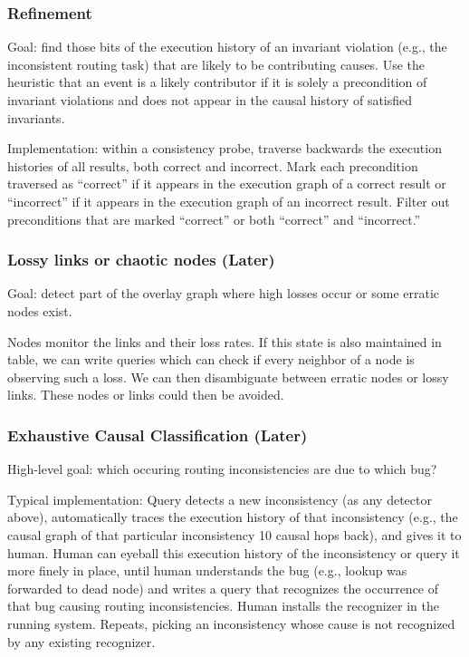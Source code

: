 \documentclass{sig-alt-full}
\begin{document}
{\subsubsection{Refinement}
Goal: find those bits of the execution history of an invariant violation
(e.g., the inconsistent routing task) that are likely to be contributing
causes.  Use the heuristic that an event is a likely contributor if it
is solely a precondition of invariant violations and does not appear in
the causal history of satisfied invariants.

Implementation: within a consistency probe, traverse backwards the
execution histories of all results, both correct and incorrect.  Mark
each precondition traversed as ``correct'' if it appears in the
execution graph of a correct result or ``incorrect'' if it appears in
the execution graph of an incorrect result.  Filter out preconditions
that are marked ``correct'' or both ``correct'' and ``incorrect.''




\subsubsection{Lossy links or chaotic nodes (Later)}

Goal: detect part of the overlay graph where high losses occur or some
erratic nodes exist.

Nodes monitor the links and their loss rates. If this state is also maintained in table,
we can write queries which can check if every neighbor of a node is observing such a loss.
We can then disambiguate between erratic nodes or lossy links. These nodes or links could then
be avoided.



\subsubsection{Exhaustive Causal Classification (Later)}

High-level goal: which occuring routing inconsistencies are due to which
bug?

Typical implementation: Query detects a new inconsistency (as any
detector above), automatically traces the execution history of that
inconsistency (e.g., the causal graph of that particular inconsistency
10 causal hops back), and gives it to human.  Human can eyeball this
execution history of the inconsistency or query it more finely in place,
until human understands the bug (e.g., lookup was forwarded to dead
node) and writes a query that recognizes the occurrence of that bug
causing routing inconsistencies.  Human installs the recognizer in the
running system. Repeats, picking an inconsistency whose cause is not
recognized by any existing recognizer.

}
\end{document}
